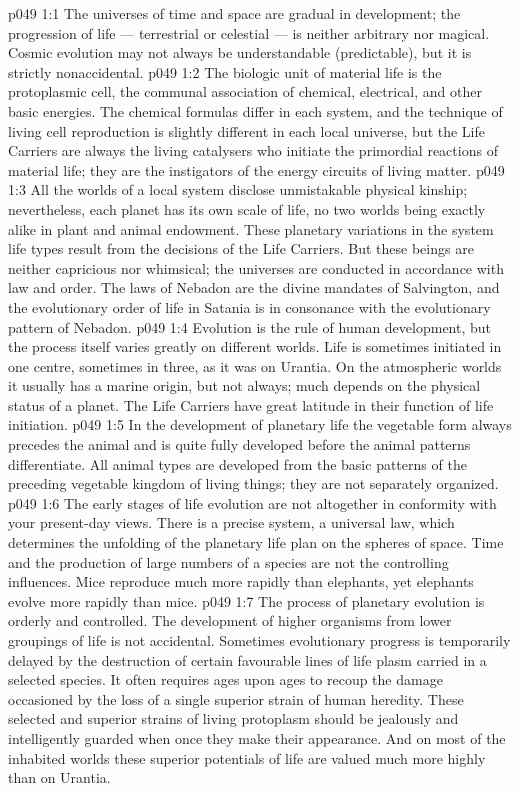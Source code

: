 \vs p049 1:1 The universes of time and space are gradual in development; the progression of life --- terrestrial or celestial --- is neither arbitrary nor magical. Cosmic evolution may not always be understandable (predictable), but it is strictly nonaccidental.
\vs p049 1:2 The biologic unit of material life is the protoplasmic cell, the communal association of chemical, electrical, and other basic energies. The chemical formulas differ in each system, and the technique of living cell reproduction is slightly different in each local universe, but the Life Carriers are always the living catalysers who initiate the primordial reactions of material life; they are the instigators of the energy circuits of living matter.
\vs p049 1:3 All the worlds of a local system disclose unmistakable physical kinship; nevertheless, each planet has its own scale of life, no two worlds being exactly alike in plant and animal endowment. These planetary variations in the system life types result from the decisions of the Life Carriers. But these beings are neither capricious nor whimsical; the universes are conducted in accordance with law and order. The laws of Nebadon are the divine mandates of Salvington, and the evolutionary order of life in Satania is in consonance with the evolutionary pattern of Nebadon.
\vs p049 1:4 Evolution is the rule of human development, but the process itself varies greatly on different worlds. Life is sometimes initiated in one centre, sometimes in three, as it was on Urantia. On the atmospheric worlds it usually has a marine origin, but not always; much depends on the physical status of a planet. The Life Carriers have great latitude in their function of life initiation.
\vs p049 1:5 In the development of planetary life the vegetable form always precedes the animal and is quite fully developed before the animal patterns differentiate. All animal types are developed from the basic patterns of the preceding vegetable kingdom of living things; they are not separately organized.
\vs p049 1:6 The early stages of life evolution are not altogether in conformity with your present\hyp{}day views.  There is a precise system, a universal law, which determines the unfolding of the planetary life plan on the spheres of space. Time and the production of large numbers of a species are not the controlling influences. Mice reproduce much more rapidly than elephants, yet elephants evolve more rapidly than mice.
\vs p049 1:7 The process of planetary evolution is orderly and controlled. The development of higher organisms from lower groupings of life is not accidental. Sometimes evolutionary progress is temporarily delayed by the destruction of certain favourable lines of life plasm carried in a selected species. It often requires ages upon ages to recoup the damage occasioned by the loss of a single superior strain of human heredity. These selected and superior strains of living protoplasm should be jealously and intelligently guarded when once they make their appearance. And on most of the inhabited worlds these superior potentials of life are valued much more highly than on Urantia.
